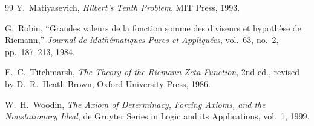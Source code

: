 \documentclass{article}
\theoremstyle{definition}
\begin{document}
\begin{thebibliography}{99}
Y.~Matiyasevich,
\emph{Hilbert's Tenth Problem},
MIT Press, 1993.

G.~Robin,
``Grandes valeurs de la fonction somme des diviseurs et hypoth\`ese de Riemann,''
\emph{Journal de Math\'ematiques Pures et Appliqu\'ees}, vol.~63, no.~2,
pp.~187--213, 1984.

E.~C.~Titchmarsh,
\emph{The Theory of the Riemann Zeta-Function},
2nd ed., revised by D.~R.~Heath-Brown, Oxford University Press, 1986.

W.~H.~Woodin,
\emph{The Axiom of Determinacy, Forcing Axioms, and the Nonstationary Ideal},
de Gruyter Series in Logic and its Applications, vol.~1, 1999.

\end{thebibliography}
\end{document}
